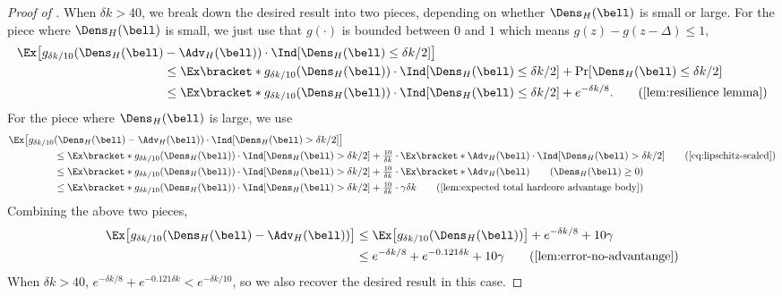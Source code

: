 \begin{proof}[Proof of ]
    When $\delta k > 40$, we break down the desired result into two pieces, depending on whether $\Dens_H(\bell)$ is small or large. For the piece where $\Dens_H(\bell)$ is small, we just use that $g(\cdot)$ is bounded between $0$ and $1$ which means $g(z) - g(z-\Delta) \leq 1$,
    \begin{align*}
         \Ex\big[g_{\delta k/10}(\Dens_H(\bell) &- \Adv_H(\bell)) \cdot \Ind[\Dens_H(\bell) \leq \delta k/2]\big] \\
         &\leq \Ex\bracket*{g_{\delta k/10}(\Dens_H(\bell))\cdot \Ind[\Dens_H(\bell) \leq \delta k/2]} + \Pr[\Dens_H(\bell) \leq \delta k/2]\\
         &\leq  \Ex\bracket*{g_{\delta k/10}(\Dens_H(\bell))\cdot \Ind[\Dens_H(\bell) \leq \delta k/2]}  + e^{-\delta k/8}. \tag{\Cref{lem:resilience lemma}}
    \end{align*}
    For the piece where $\Dens_H(\bell)$ is large, we use 
    \begin{align*}
        \Ex\big[g_{\delta k/10}&(\Dens_H(\bell) - \Adv_H(\bell)) \cdot \Ind[\Dens_H(\bell) > \delta k/2]\big] \\
        &\leq \Ex\bracket*{g_{\delta k/10}(\Dens_H(\bell))\cdot \Ind[\Dens_H(\bell) > \delta k/2]} + \tfrac{10}{\delta k} \cdot \Ex\bracket*{\Adv_H(\bell)\cdot \Ind[\Dens_H(\bell) > \delta k/2]} \tag{\Cref{eq:lipschitz-scaled}} \\
        &\leq \Ex\bracket*{g_{\delta k/10}(\Dens_H(\bell))\cdot \Ind[\Dens_H(\bell) > \delta k/2]} + \tfrac{10}{\delta k} \cdot \Ex\bracket*{\Adv_H(\bell)} \tag{$\Dens_H(\bell) \geq 0$} \\
        &\leq \Ex\bracket*{g_{\delta k/10}(\Dens_H(\bell))\cdot \Ind[\Dens_H(\bell) > \delta k/2]} + \tfrac{10}{\delta k} \cdot \gamma \delta k \tag{\Cref{lem:expected total hardcore advantage body}} 
    \end{align*}
    Combining the above two pieces,
    \begin{align*}
        \Ex\big[g_{\delta k/10}(\Dens_H(\bell) - \Adv_H(\bell))\big] &\leq \Ex\big[g_{\delta k/10}(\Dens_H(\bell))\big] + e^{-\delta k/8} + 10\gamma \\
        &\leq e^{-\delta k/8} + e^{-0.121 \delta k} + 10\gamma \tag{\Cref{lem:error-no-advantange}}
    \end{align*}
    When $\delta k > 40$, $e^{-\delta k/8} + e^{-0.121 \delta k} < e^{-\delta k/10}$, so we also recover the desired result in this case.
\end{proof}









